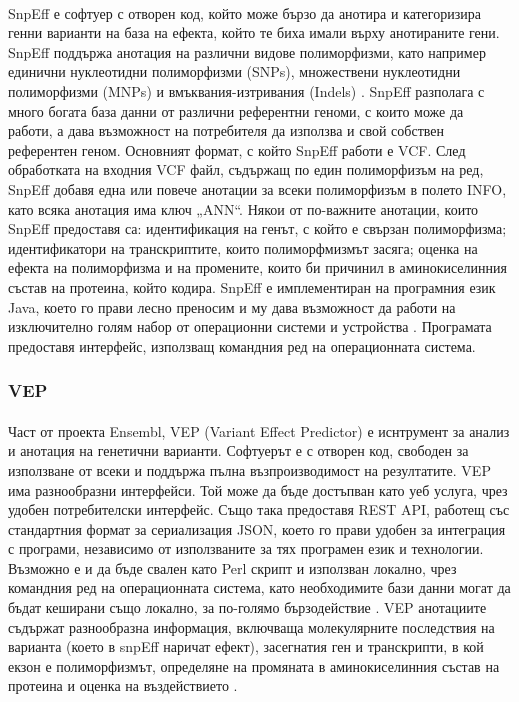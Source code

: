 \documentclass[pdftex,cyrillic,14pt,a4page,twoside,openright]{extreport}
\begin{document}
\paragraph{}
SnpEff е софтуер с отворен код, който може бързо да анотира и категоризира генни варианти на база на ефекта, който те биха имали върху анотираните гени. SnpEff поддържа анотация на различни видове полиморфизми, като например единични нуклеотидни полиморфизми (SNPs), множествени нуклеотидни полиморфизми (MNPs) и вмъквания-изтривания (Indels) \cite{cingolani2012}. SnpEff разполага с много богата база данни от различни референтни геноми, с които може да работи, а дава възможност на потребителя да използва и свой собствен референтен геном. Основният формат, с който SnpEff работи е VCF. След обработката на входния VCF файл, съдържащ по един полиморфизъм на ред, SnpEff добавя една или повече анотации за всеки полиморфизъм в полето INFO, като всяка анотация има ключ „ANN“. Някои от по-важните анотации, които SnpEff предоставя са: идентификация на генът, с който е свързан полиморфизма; идентификатори на транскриптите, които полиморфмизмът засяга; оценка на ефекта на полиморфизма и на промените, които би причинил в аминокиселинния състав на протеина, който кодира. SnpEff е имплементиран на програмния език Java, което го прави лесно преносим и му дава възможност да работи на изключително голям набор от операционни системи и устройства \cite{schildt2020complete}. Програмата предоставя интерфейс, използващ командния ред на операционната система.

\subsubsection{VEP}
\paragraph{}
Част от проекта Ensembl, VEP (Variant Effect Predictor) е иснтрумент за анализ и анотация на генетични варианти. Софтуерът е с отворен код, свободен за използване от всеки и поддържа пълна възпроизводимост на резултатите. VEP има разнообразни интерфейси. Той може да бъде достъпван като уеб услуга, чрез удобен потребителски интерфейс. Също така предоставя REST API, работещ със стандартния формат за сериализация JSON, което го прави удобен за интеграция с програми, независимо от използваните за тях програмен език и технологии. Възможно е и да бъде свален като Perl скрипт и използван локално, чрез командния ред на операционната система, като необходимите бази данни могат да бъдат кеширани също локално, за по-голямо бързодействие \cite{mclaren2016}. VEP анотациите съдържат разнообразна информация, включваща молекулярните последствия на варианта (което в snpEff наричат ефект), засегнатия ген и транскрипти, в кой екзон е полиморфизмът, определяне на промяната в аминокиселинния състав на протеина и оценка на въздействието \cite{hunt2022}.
\end{document}
